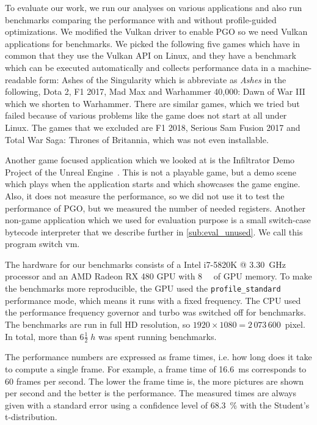 \clearpage
{}
To evaluate our work, we run our analyses on various applications and also run benchmarks comparing the performance with and without profile-guided optimizations.
We modified the Vulkan driver to enable PGO so we need Vulkan applications for benchmarks.
We picked the following five games which have in common that they use the Vulkan API on Linux, and they have a benchmark which can be executed automatically and collects performance data in a machine-readable form:
Ashes of the Singularity which is abbreviate as \emph{Ashes} in the following, Dota 2, F1 2017, Mad Max and Warhammer 40,000: Dawn of War III which we shorten to Warhammer.
There are similar games, which we tried but failed because of various problems like the game does not start at all under Linux.
The games that we excluded are F1 2018, Serious Sam Fusion 2017 and Total War Saga: Thrones of Britannia, which was not even installable.

Another game focused application which we looked at is the Infiltrator Demo Project of the Unreal Engine~\cite{Games2015}.
This is not a playable game, but a demo scene which plays when the application starts and which showcases the game engine.
Also, it does not measure the performance, so we did not use it to test the performance of PGO, but we measured the number of needed registers.
Another non-game application which we used for evaluation purpose is a small switch-case bytecode interpreter that we describe further in \cref{sub:eval_unused}. We call this program switch vm.

The hardware for our benchmarks consists of a Intel i7-5820K @ \SI{3.30}{\giga\hertz} processor and an AMD Radeon RX 480 GPU with \SI{8}{\giga\byte} of GPU memory.
To make the benchmarks more reproducible, the GPU used the \texttt{profile\_standard} performance mode, which means it runs with a fixed frequency.
The CPU used the performance frequency governor and turbo was switched off for benchmarks.
The benchmarks are run in full HD resolution, so $1920 \times 1080 = 2\,073\,600$~pixel.
In total, more than $6 \frac{1}{2}\;\si{h}$ was spent running benchmarks.

The performance numbers are expressed as frame times, i.e. how long does it take to compute a single frame.
For example, a frame time of \SI{16.6}{\milli\second} corresponds to 60 frames per second.
The lower the frame time is, the more pictures are shown per second and the better is the performance.
The measured times are always given with a standard error using a confidence level of \SI{68.3}{\percent} with the Student's t-distribution.

